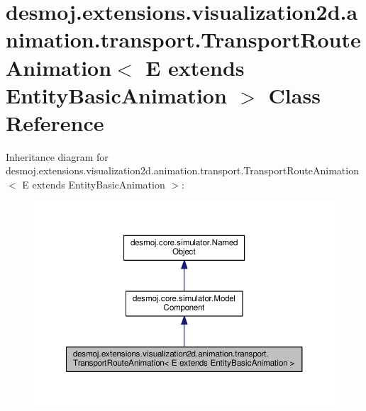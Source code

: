 \section{desmoj.\-extensions.\-visualization2d.\-animation.\-transport.\-Transport\-Route\-Animation$<$ E extends Entity\-Basic\-Animation $>$ Class Reference}
\label{classdesmoj_1_1extensions_1_1visualization2d_1_1animation_1_1transport_1_1_transport_route_anima35091e18f1d33f0216812bc3511eb92a}


Inheritance diagram for desmoj.\-extensions.\-visualization2d.\-animation.\-transport.\-Transport\-Route\-Animation$<$ E extends Entity\-Basic\-Animation $>$\-:
\nopagebreak
\begin{figure}[H]
\begin{center}
\leavevmode
\includegraphics[width=350pt]{classdesmoj_1_1extensions_1_1visualization2d_1_1animation_1_1transport_1_1_transport_route_anima228e8f925fc27c07cdd660e898efe204}
\end{center}
\end{figure}


